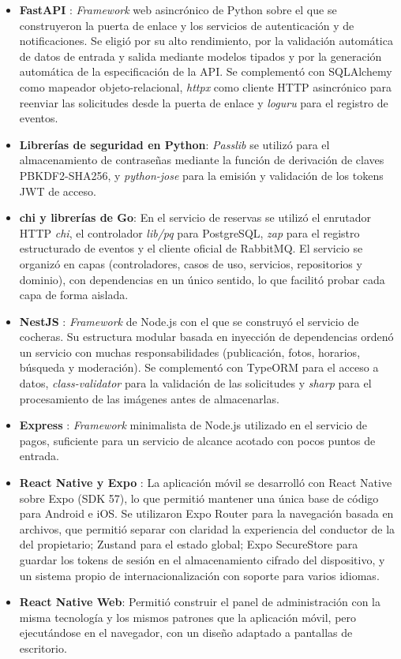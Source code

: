 \begin{itemize}
    \item \textbf{FastAPI} \autocite{fastapi}: \textit{Framework} web asincrónico de Python sobre el que se construyeron la puerta de enlace y los servicios de autenticación y de notificaciones. Se eligió por su alto rendimiento, por la validación automática de datos de entrada y salida mediante modelos tipados y por la generación automática de la especificación de la API. Se complementó con SQLAlchemy como mapeador objeto-relacional, \textit{httpx} como cliente HTTP asincrónico para reenviar las solicitudes desde la puerta de enlace y \textit{loguru} para el registro de eventos.
    \item \textbf{Librerías de seguridad en Python}: \textit{Passlib} se utilizó para el almacenamiento de contraseñas mediante la función de derivación de claves PBKDF2-SHA256, y \textit{python-jose} para la emisión y validación de los tokens JWT de acceso.
    \item \textbf{chi y librerías de Go}: En el servicio de reservas se utilizó el enrutador HTTP \textit{chi}, el controlador \textit{lib/pq} para PostgreSQL, \textit{zap} para el registro estructurado de eventos y el cliente oficial de RabbitMQ. El servicio se organizó en capas (controladores, casos de uso, servicios, repositorios y dominio), con dependencias en un único sentido, lo que facilitó probar cada capa de forma aislada.
    \item \textbf{NestJS} \autocite{nestjs}: \textit{Framework} de Node.js con el que se construyó el servicio de cocheras. Su estructura modular basada en inyección de dependencias ordenó un servicio con muchas responsabilidades (publicación, fotos, horarios, búsqueda y moderación). Se complementó con TypeORM para el acceso a datos, \textit{class-validator} para la validación de las solicitudes y \textit{sharp} para el procesamiento de las imágenes antes de almacenarlas.
    \item \textbf{Express} \autocite{expressjs}: \textit{Framework} minimalista de Node.js utilizado en el servicio de pagos, suficiente para un servicio de alcance acotado con pocos puntos de entrada.
    \item \textbf{React Native y Expo} \autocite{reactnative, expo}: La aplicación móvil se desarrolló con React Native sobre Expo (SDK 57), lo que permitió mantener una única base de código para Android e iOS. Se utilizaron Expo Router para la navegación basada en archivos, que permitió separar con claridad la experiencia del conductor de la del propietario; Zustand para el estado global; Expo SecureStore para guardar los tokens de sesión en el almacenamiento cifrado del dispositivo, y un sistema propio de internacionalización con soporte para varios idiomas.
    \item \textbf{React Native Web}: Permitió construir el panel de administración con la misma tecnología y los mismos patrones que la aplicación móvil, pero ejecutándose en el navegador, con un diseño adaptado a pantallas de escritorio.
\end{itemize}

